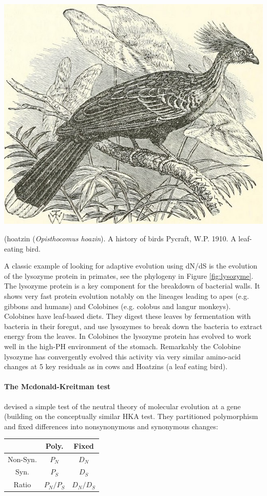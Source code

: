 \begin{marginfigure}
\begin{center}
\includegraphics[width=0.8  \textwidth]{illustration_images/Genetic_drift/Hoatzin/14747388314_85798ba97e_z.jpg}
\end{center}
\caption{ (hoatzin ({\it Opisthocomus hoazin}). A history of birds
  Pycraft, W.P. 1910.  A leaf-eating bird.} \label{fig:hoatzin}  
\end{marginfigure} 
A classic example of looking for adaptive evolution using dN/dS is the
evolution of the lysozyme protein in primates\citep{Messier:97,Yang:98}, see
the phylogeny in Figure \ref{fig:lysozyme}. The lysozyme protein is
a key component for the breakdown of bacterial walls. It shows very
fast protein evolution notably on the lineages leading to apes (e.g. gibbons
and humans) and Colobines (e.g. colobus and langur monkeys). Colobines have leaf-based diets. They digest
these leaves by fermentation with bacteria in their foregut, and use lysozymes to break down the bacteria to extract energy from the
leaves. In Colobines the lysozyme protein has evolved to work well in the high-PH environment of the stomach. Remarkably the Colobine
lysozyme has convergently evolved this activity via very similar
amino-acid changes at 5 key residuals as in cows and Hoatzins (a leaf
eating bird). 

\paragraph{The Mcdonald-Kreitman test}
\citet{mcdonald:91} devised a simple test of the neutral theory of molecular
evolution at a gene (building on the conceptually similar HKA
test\cite{HKA}. They partitioned polymorphism and fixed differences into 
nonsynonymous and synonymous changes:
\begin{center}
\begin{tabular}{ccc}
 & Poly. & Fixed \\
\hline 
Non-Syn. &    $P_N$  &   $D_N$  \\
Syn. &    $P_S$   &     $D_S$   \\
Ratio & $P_N/P_S$ & $D_N/D_S$
\end{tabular}
\end{center}

